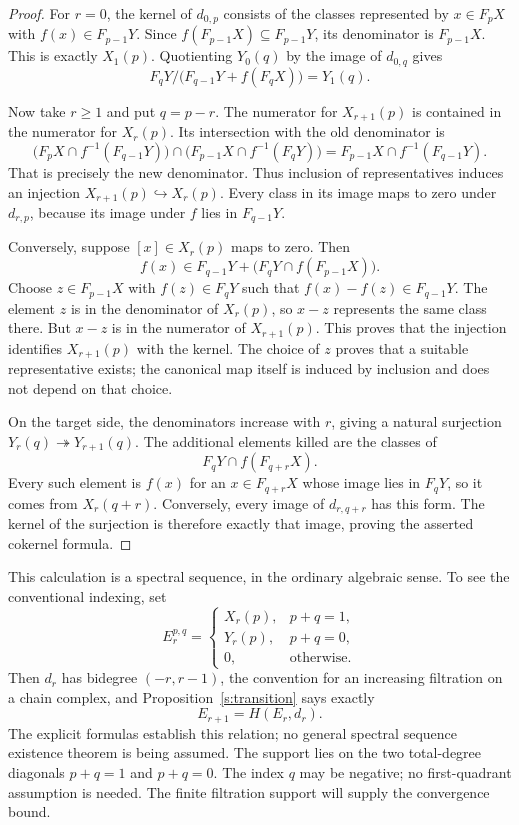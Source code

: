 \documentclass[11pt]{article}
\theoremstyle{definition}
\theoremstyle{remark}\newtheorem{remark}[theorem]{Remark}
\begin{document}
\begin{proof}
For $r=0$, the kernel of $d_{0,p}$ consists of the classes represented by
$x\in F_pX$ with $f(x)\in F_{p-1}Y$. Since
$f(F_{p-1}X)\subseteq F_{p-1}Y$, its denominator is $F_{p-1}X$.
This is exactly $X_1(p)$. Quotienting $Y_0(q)$ by the image of $d_{0,q}$
gives
\[
F_qY/\bigl(F_{q-1}Y+f(F_qX)\bigr)=Y_1(q).
\]

Now take $r\geq1$ and put $q=p-r$. The numerator for $X_{r+1}(p)$ is
contained in the numerator for $X_r(p)$. Its intersection with the old
denominator is
\[
\bigl(F_pX\cap f^{-1}(F_{q-1}Y)\bigr)
\cap\bigl(F_{p-1}X\cap f^{-1}(F_qY)\bigr)
=F_{p-1}X\cap f^{-1}(F_{q-1}Y).
\]
That is precisely the new denominator. Thus inclusion of representatives
induces an injection $X_{r+1}(p)\hookrightarrow X_r(p)$.
Every class in its image maps to zero under $d_{r,p}$, because its image
under $f$ lies in $F_{q-1}Y$.

Conversely, suppose $[x]\in X_r(p)$ maps to zero. Then
\[
f(x)\in F_{q-1}Y+\bigl(F_qY\cap f(F_{p-1}X)\bigr).
\]
Choose $z\in F_{p-1}X$ with $f(z)\in F_qY$ such that
$f(x)-f(z)\in F_{q-1}Y$. The element $z$ is in the denominator of
$X_r(p)$, so $x-z$ represents the same class there. But $x-z$ is in the
numerator of $X_{r+1}(p)$. This proves that the injection identifies
$X_{r+1}(p)$ with the kernel.
The choice of $z$ proves that a suitable representative exists; the
canonical map itself is induced by inclusion and does not depend on that
choice.

On the target side, the denominators increase with $r$, giving a natural
surjection $Y_r(q)\twoheadrightarrow Y_{r+1}(q)$. The additional elements
killed are the classes of
\[
F_qY\cap f(F_{q+r}X).
\]
Every such element is $f(x)$ for an $x\in F_{q+r}X$ whose image lies in
$F_qY$, so it comes from $X_r(q+r)$. Conversely, every image of
$d_{r,q+r}$ has this form. The kernel of the surjection is therefore
exactly that image, proving the asserted cokernel formula.
\end{proof}

This calculation is a spectral sequence, in the ordinary algebraic
sense. To see the conventional indexing, set
\[
E_r^{p,q}=
\begin{cases}
X_r(p),&p+q=1,\\
Y_r(p),&p+q=0,\\
0,&\text{otherwise}.
\end{cases}
\]
Then $d_r$ has bidegree $(-r,r-1)$, the convention for an increasing
filtration on a chain complex, and Proposition~\ref{s:transition} says
exactly
\[
E_{r+1}=H(E_r,d_r).
\]
The explicit formulas establish this relation; no general spectral
sequence existence theorem is being assumed.
The support lies on the two total-degree diagonals $p+q=1$ and $p+q=0$.
The index $q$ may be negative; no first-quadrant assumption is needed.
The finite filtration support will supply the convergence bound.
\end{document}
